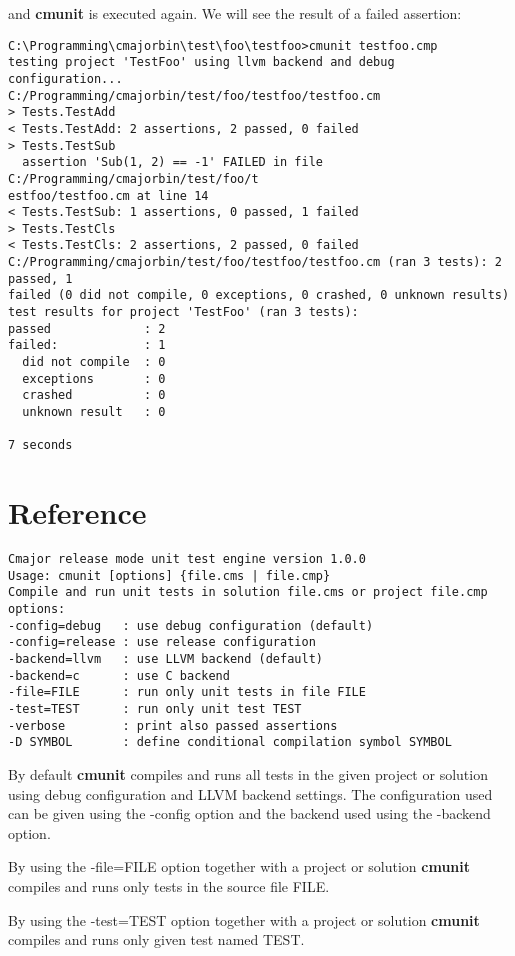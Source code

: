 \documentclass[oneside, a4paper, 11pt]{article}
\begin{document}
and \textbf{cmunit} is executed again. We will see the result of a failed
assertion:

\begin{verbatim}
C:\Programming\cmajorbin\test\foo\testfoo>cmunit testfoo.cmp
testing project 'TestFoo' using llvm backend and debug configuration...
C:/Programming/cmajorbin/test/foo/testfoo/testfoo.cm
> Tests.TestAdd
< Tests.TestAdd: 2 assertions, 2 passed, 0 failed
> Tests.TestSub
  assertion 'Sub(1, 2) == -1' FAILED in file C:/Programming/cmajorbin/test/foo/t
estfoo/testfoo.cm at line 14
< Tests.TestSub: 1 assertions, 0 passed, 1 failed
> Tests.TestCls
< Tests.TestCls: 2 assertions, 2 passed, 0 failed
C:/Programming/cmajorbin/test/foo/testfoo/testfoo.cm (ran 3 tests): 2 passed, 1
failed (0 did not compile, 0 exceptions, 0 crashed, 0 unknown results)
test results for project 'TestFoo' (ran 3 tests):
passed             : 2
failed:            : 1
  did not compile  : 0
  exceptions       : 0
  crashed          : 0
  unknown result   : 0

7 seconds
\end{verbatim}

\section{Reference}

\begin{verbatim}
Cmajor release mode unit test engine version 1.0.0
Usage: cmunit [options] {file.cms | file.cmp}
Compile and run unit tests in solution file.cms or project file.cmp
options:
-config=debug   : use debug configuration (default)
-config=release : use release configuration
-backend=llvm   : use LLVM backend (default)
-backend=c      : use C backend
-file=FILE      : run only unit tests in file FILE
-test=TEST      : run only unit test TEST
-verbose        : print also passed assertions
-D SYMBOL       : define conditional compilation symbol SYMBOL\end{verbatim}

By default \textbf{cmunit} compiles and runs all tests in the given project or solution
using debug configuration and LLVM backend settings.
The configuration used can be given using the -config option and the backend used
using the -backend option.

By using the -file=FILE option together with a project or solution \textbf{cmunit} compiles and
runs only tests in the source file FILE.

By using the -test=TEST option together with a project or solution \textbf{cmunit} compiles and
runs only given test named TEST.
\end{document}
